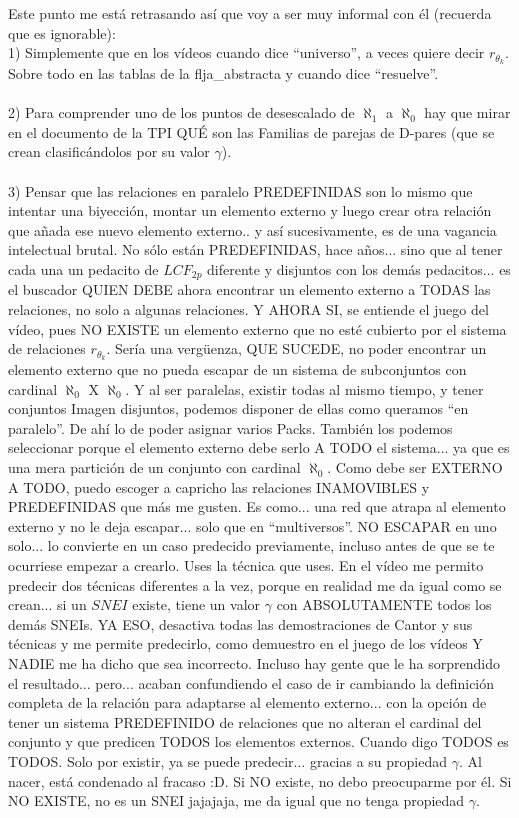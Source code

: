 	\noindent
	Este punto me está retrasando así que voy a ser muy informal con él (recuerda que es ignorable):\\
	1) Simplemente que en los vídeos cuando dice ``universo'', a veces quiere decir $r_{\theta_{k}}$. Sobre todo en las tablas de la flja\_abstracta y cuando dice ``resuelve''.\\\\
	2) Para comprender uno de los puntos de desescalado de $\aleph_{1}$ a $\aleph_{0}$ hay que mirar en el documento de la TPI QUÉ son las Familias de parejas de D-pares (que se crean clasificándolos por su valor $\gamma$).\\\\
	3) Pensar que las relaciones en paralelo PREDEFINIDAS son lo mismo que intentar una biyección, montar un elemento externo y luego crear otra relación que añada ese nuevo elemento externo.. y así sucesivamente, es de una vagancia intelectual brutal. No sólo están PREDEFINIDAS, hace años... sino que al tener cada una un pedacito de $LCF_{2p}$ diferente y disjuntos con los demás pedacitos... es el buscador QUIEN DEBE ahora encontrar un elemento externo a TODAS las relaciones, no solo a algunas relaciones. Y AHORA SI, se entiende el juego del vídeo, pues NO EXISTE un elemento externo que no esté cubierto por el sistema de relaciones $r_{\theta_{k}}$. Sería una vergüenza, QUE SUCEDE, no poder encontrar un elemento externo que no pueda escapar de un sistema de subconjuntos con cardinal $\aleph_{0}$ X $\aleph_{0}$. Y al ser paralelas, existir todas al mismo tiempo, y tener conjuntos Imagen disjuntos, podemos disponer de ellas como queramos ``en paralelo''. De ahí lo de poder asignar varios Packs. También los podemos seleccionar porque el elemento externo debe serlo A TODO el sistema... ya que es una mera partición de un conjunto con cardinal $\aleph_{0}$. Como debe ser EXTERNO A TODO, puedo escoger a capricho las relaciones INAMOVIBLES y PREDEFINIDAS que más me gusten. Es como... una red que atrapa al elemento externo y no le deja escapar... solo que en ``multiversos''. NO ESCAPAR en uno solo... lo convierte en un caso predecido previamente, incluso antes de que se te ocurriese empezar a crearlo. Uses la técnica que uses. En el vídeo me permito predecir dos técnicas diferentes a la vez, porque en realidad me da igual como se crean... si un $SNEI$ existe, tiene un valor $\gamma$ con ABSOLUTAMENTE todos los demás SNEIs. YA ESO, desactiva todas las demostraciones de Cantor y sus técnicas y me permite predecirlo, como demuestro en el juego de los vídeos Y NADIE me ha dicho que sea incorrecto. Incluso hay gente que le ha sorprendido el resultado... pero... acaban confundiendo el caso de ir cambiando la definición completa de la relación para adaptarse al elemento externo... con la opción de tener un sistema PREDEFINIDO de relaciones que no alteran el cardinal del conjunto y que predicen TODOS los elementos externos. Cuando digo TODOS es TODOS. Solo por existir, ya se puede predecir... gracias a su propiedad $\gamma$. Al nacer, está condenado al fracaso :D. Si NO existe, no debo preocuparme por él. Si NO EXISTE, no es un SNEI jajajaja, me da igual que no tenga propiedad $\gamma$.
	
